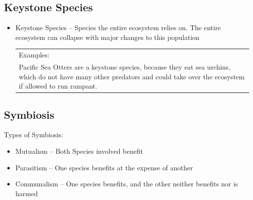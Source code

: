 \documentclass{article}
\begin{document}
\subsection{Keystone Species}
\begin{itemize}
\item Keystone Species -- Species the entire ecosystem relies on. The entire ecosystem can collapse with major changes to this population\\
\begin{tabular}{| p{10cm}}
Examples:\\
Pacific Sea Otters are a keystone species,  because they eat sea urchins, which do not have many other predators and could take over the ecosystem if allowed to run rampant.
\end{tabular}
\end{itemize}

\subsection{Symbiosis}
Types of Symbiosis:
\begin{itemize}
\item Mutualism -- Both Species involved benefit
\item Parasitism -- One species benefits at the expense of another
\item Communalism -- One species benefits, and the other neither benefits nor is harmed
\end{itemize}
\end{document}
